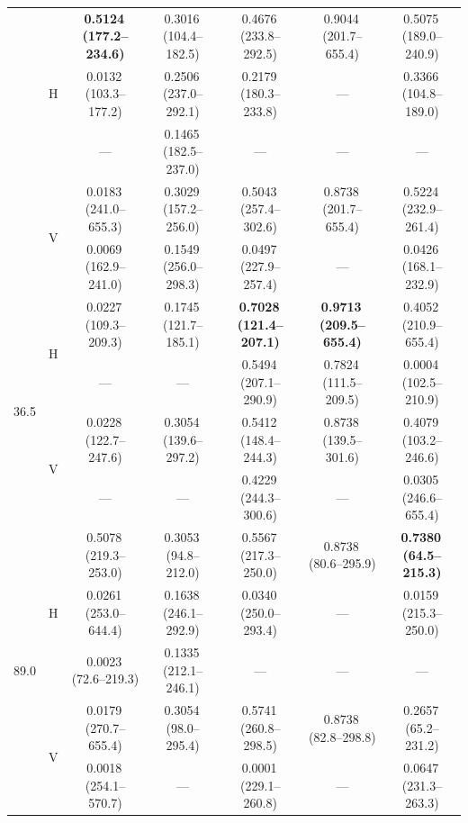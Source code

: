 \documentclass[preprint,review,12pt,authoryear]{elsarticle}
\begin{document}
\begin{table}[p]
{\begin{tabular}{@{}llccccc@{}}
    & \multirow{3}{*}{H}
        & \textbf{0.5124\,(177.2--234.6)} & 0.3016\,(104.4--182.5) & 0.4676\,(233.8--292.5) & 0.9044\,(201.7--655.4) & 0.5075\,(189.0--240.9) \\
    &   & 0.0132\,(103.3--177.2) & 0.2506\,(237.0--292.1) & 0.2179\,(180.3--233.8) & ---                   & 0.3366\,(104.8--189.0) \\
    &   & ---                   & 0.1465\,(182.5--237.0) & ---                   & ---                   & --- \\[6pt]
    & \multirow{2}{*}{V}
        & 0.0183\,(241.0--655.3) & 0.3029\,(157.2--256.0) & 0.5043\,(257.4--302.6) & 0.8738\,(201.7--655.4) & 0.5224\,(232.9--261.4) \\
    &   & 0.0069\,(162.9--241.0) & 0.1549\,(256.0--298.3) & 0.0497\,(227.9--257.4) & ---                   & 0.0426\,(168.1--232.9) \\
\midrule
\multirow{4}{*}{36.5}
    & \multirow{2}{*}{H}
        & 0.0227\,(109.3--209.3) & 0.1745\,(121.7--185.1) & \textbf{0.7028\,(121.4--207.1)} & \textbf{0.9713\,(209.5--655.4)} & 0.4052\,(210.9--655.4) \\
    &   & ---                   & ---                   & 0.5494\,(207.1--290.9) & 0.7824\,(111.5--209.5) & 0.0004\,(102.5--210.9) \\[6pt]
    & \multirow{2}{*}{V}
        & 0.0228\,(122.7--247.6) & 0.3054\,(139.6--297.2) & 0.5412\,(148.4--244.3) & 0.8738\,(139.5--301.6) & 0.4079\,(103.2--246.6) \\
    &   & ---                   & ---                   & 0.4229\,(244.3--300.6) & ---                   & 0.0305\,(246.6--655.4) \\
\midrule
\multirow{5}{*}{89.0}
    & \multirow{3}{*}{H}
        & 0.5078\,(219.3--253.0) & 0.3053\,(94.8--212.0)  & 0.5567\,(217.3--250.0) & 0.8738\,(80.6--295.9)  & \textbf{0.7380\,(64.5--215.3)}  \\
    &   & 0.0261\,(253.0--644.4) & 0.1638\,(246.1--292.9) & 0.0340\,(250.0--293.4) & ---                   & 0.0159\,(215.3--250.0) \\
    &   & 0.0023\,(72.6--219.3)  & 0.1335\,(212.1--246.1) & ---                   & ---                   & ---\\[6pt]
    & \multirow{2}{*}{V}
        & 0.0179\,(270.7--655.4) & 0.3054\,(98.0--295.4)  & 0.5741\,(260.8--298.5) & 0.8738\,(82.8--298.8)  & 0.2657\,(65.2--231.2)  \\
    &   & 0.0018\,(254.1--570.7) & ---                   & 0.0001\,(229.1--260.8) & ---                   & 0.0647\,(231.3--263.3) \\
\bottomrule
\end{tabular}}
\end{table}
\end{document}
